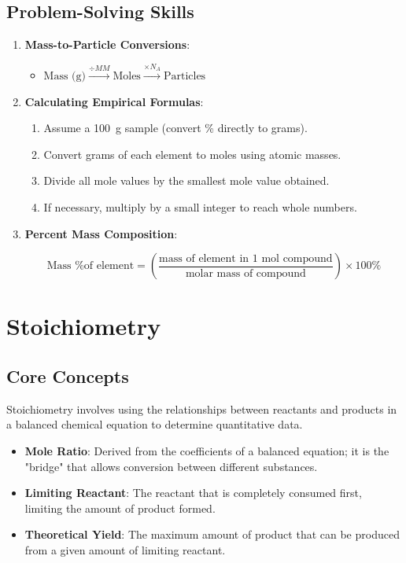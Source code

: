 \documentclass[11pt]{article}
\begin{document}
\subsection{Problem-Solving Skills}
\begin{enumerate}
    \item \textbf{Mass-to-Particle Conversions}:
    \begin{itemize}
        \item $\text{Mass (g)} \xrightarrow{\div MM} \text{Moles} \xrightarrow{\times N_A} \text{Particles}$
    \end{itemize}
    
    \item \textbf{Calculating Empirical Formulas}:
    \begin{enumerate}[label=\alph*)]
        \item Assume a \SI{100}{\gram} sample (convert \% directly to grams).
        \item Convert grams of each element to moles using atomic masses.
        \item Divide all mole values by the smallest mole value obtained.
        \item If necessary, multiply by a small integer to reach whole numbers.
    \end{enumerate}

    \item \textbf{Percent Mass Composition}:
    \begin{tcolorbox}[memorize]
        \[ \text{Mass \% of element} = \left( \frac{\text{mass of element in 1 mol compound}}{\text{molar mass of compound}} \right) \times 100\% \]
    \end{tcolorbox}
\end{enumerate}

\newpage

\section{Stoichiometry}

\subsection{Core Concepts}
Stoichiometry involves using the relationships between reactants and products in a balanced chemical equation to determine quantitative data.

\begin{itemize}
    \item \textbf{Mole Ratio}: Derived from the coefficients of a balanced equation; it is the "bridge" that allows conversion between different substances.
    \item \textbf{Limiting Reactant}: The reactant that is completely consumed first, limiting the amount of product formed.
    \item \textbf{Theoretical Yield}: The maximum amount of product that can be produced from a given amount of limiting reactant.
\end{itemize}
\end{document}
